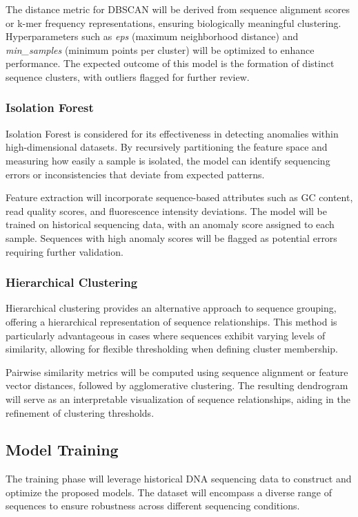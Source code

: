   The distance metric for DBSCAN will be derived from sequence alignment scores or k-mer frequency representations, ensuring biologically meaningful clustering. Hyperparameters such as \textit{eps} (maximum neighborhood distance) and \textit{min\_samples} (minimum points per cluster) will be optimized to enhance performance. The expected outcome of this model is the formation of distinct sequence clusters, with outliers flagged for further review.
  
  \subsubsection{Isolation Forest}
  Isolation Forest is considered for its effectiveness in detecting anomalies within high-dimensional datasets. By recursively partitioning the feature space and measuring how easily a sample is isolated, the model can identify sequencing errors or inconsistencies that deviate from expected patterns.
  
  Feature extraction will incorporate sequence-based attributes such as GC content, read quality scores, and fluorescence intensity deviations. The model will be trained on historical sequencing data, with an anomaly score assigned to each sample. Sequences with high anomaly scores will be flagged as potential errors requiring further validation.
  
  \subsubsection{Hierarchical Clustering}
  Hierarchical clustering provides an alternative approach to sequence grouping, offering a hierarchical representation of sequence relationships. This method is particularly advantageous in cases where sequences exhibit varying levels of similarity, allowing for flexible thresholding when defining cluster membership.
  
  Pairwise similarity metrics will be computed using sequence alignment or feature vector distances, followed by agglomerative clustering. The resulting dendrogram will serve as an interpretable visualization of sequence relationships, aiding in the refinement of clustering thresholds.
  
  \subsection{Model Training}
  The training phase will leverage historical DNA sequencing data to construct and optimize the proposed models. The dataset will encompass a diverse range of sequences to ensure robustness across different sequencing conditions.
  

